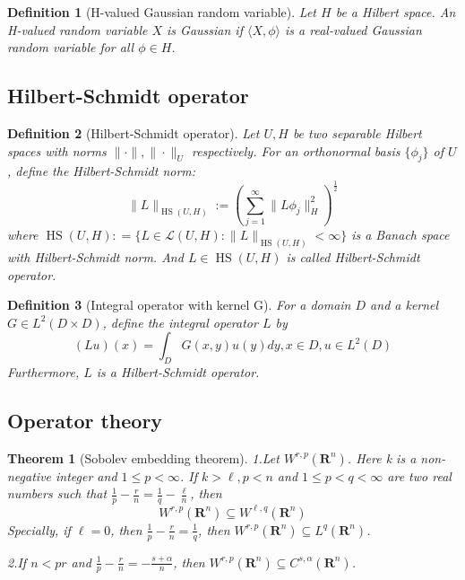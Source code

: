 \documentclass{article}
\newtheorem{theorem}{Theorem}
\newtheorem{definition}{Definition}
\begin{document}
\begin{definition}[H-valued Gaussian random variable]
    Let $H$ be a Hilbert space. An H-valued random variable $X$ is Gaussian if 
    $\langle X, \phi\rangle$ is a real-valued Gaussian random variable for all $\phi \in H$.
\end{definition}
\subsection{Hilbert-Schmidt operator}
\begin{definition}[Hilbert-Schmidt operator]
    Let $U, H$ be two separable Hilbert spaces with norms $\|\cdot\|, \|\cdot\|_U$ respectively. 
    For an orthonormal basis $\{\phi_j\}$ of $U$, define the Hilbert-Schmidt norm:
    \begin{equation}
        \|L\|_{\operatorname{HS}(U, H)}:=\left(\sum_{j=1}^\infty \|L\phi_j\|_H^2\right)^{\frac{1}{2}}
    \end{equation}
    where $\operatorname{HS}(U, H): = \{L\in \mathcal{L}(U, H): \|L\|_{\operatorname{HS}(U, H)}<\infty\}$ is a Banach space with Hilbert-Schmidt norm.
    And $L\in \operatorname{HS}(U, H)$ is called Hilbert-Schmidt operator.
\end{definition}
\begin{definition}[Integral operator with kernel G]
    For a domain $D$ and a kernel $G\in L^2(D\times D)$, define the integral operator $L$ by
    \begin{equation}
        (Lu)(x) = \int_D G(x, y)u(y)dy, x\in D, u\in L^2(D)
    \end{equation}
    Furthermore, $L$ is a Hilbert-Schmidt operator.
\end{definition}

\subsection{Operator theory}
\begin{theorem}[Sobolev embedding theorem]
    1.Let $W^{r, p}\left(\mathbf{R}^{n}\right)$. Here k is a non-negative integer and $1 \leq p<\infty$. 
    If $k>\ell, p<n$ and $1 \leq p<q<\infty$ are two real numbers such that
    $\frac{1}{p}-\frac{r}{n}=\frac{1}{q}-\frac{\ell}{n}$, then
    \begin{equation}
        W^{r, p}\left(\mathbf{R}^{n}\right) \subseteq W^{\ell, q}\left(\mathbf{R}^{n}\right)
    \end{equation}
    Specially, if $\ell = 0$, then $\frac{1}{p}-\frac{r}{n}=\frac{1}{q}$, then $W^{r, p}\left(\mathbf{R}^{n}\right) \subseteq L^q\left(\mathbf{R}^{n}\right)$.

    2.If $n<pr$ and $\frac{1}{p}-\frac{r}{n}=-\frac{s+\alpha}{n}$, then $W^{r, p}\left(\mathbf{R}^{n}\right) \subseteq C^{s,\alpha}\left(\mathbf{R}^{n}\right)$.

\end{theorem}
\end{document}
